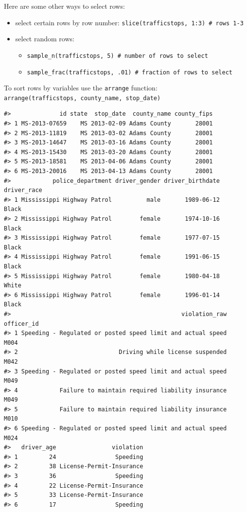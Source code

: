 \documentclass[]{book}
\providecommand{\tightlist}{%
  \setlength{\itemsep}{0pt}\setlength{\parskip}{0pt}}
\theoremstyle{definition}
\theoremstyle{definition}
\theoremstyle{definition}
\theoremstyle{remark}
\begin{document}
Here are some other ways to select rows:

\begin{itemize}
\tightlist
\item
  select certain rows by row number:
  \texttt{slice(trafficstops,\ 1:3)\ \#\ rows\ 1-3}
\item
  select random rows:

  \begin{itemize}
  \tightlist
  \item
    \texttt{sample\_n(trafficstops,\ 5)\ \#\ number\ of\ rows\ to\ select}
  \item
    \texttt{sample\_frac(trafficstops,\ .01)\ \#\ fraction\ of\ rows\ to\ select}
  \end{itemize}
\end{itemize}

To sort rows by variables use the \texttt{arrange} function:
\texttt{arrange(trafficstops,\ county\_name,\ stop\_date)}

\begin{verbatim}
#>              id state  stop_date  county_name county_fips
#> 1 MS-2013-07659    MS 2013-02-09 Adams County       28001
#> 2 MS-2013-11819    MS 2013-03-02 Adams County       28001
#> 3 MS-2013-14647    MS 2013-03-16 Adams County       28001
#> 4 MS-2013-15430    MS 2013-03-20 Adams County       28001
#> 5 MS-2013-18581    MS 2013-04-06 Adams County       28001
#> 6 MS-2013-20016    MS 2013-04-13 Adams County       28001
#>            police_department driver_gender driver_birthdate driver_race
#> 1 Mississippi Highway Patrol          male       1989-06-12       Black
#> 2 Mississippi Highway Patrol        female       1974-10-16       Black
#> 3 Mississippi Highway Patrol        female       1977-07-15       Black
#> 4 Mississippi Highway Patrol        female       1991-06-15       Black
#> 5 Mississippi Highway Patrol        female       1980-04-18       White
#> 6 Mississippi Highway Patrol        female       1996-01-14       Black
#>                                                 violation_raw officer_id
#> 1 Speeding - Regulated or posted speed limit and actual speed       M004
#> 2                             Driving while license suspended       M042
#> 3 Speeding - Regulated or posted speed limit and actual speed       M049
#> 4            Failure to maintain required liability insurance       M049
#> 5            Failure to maintain required liability insurance       M010
#> 6 Speeding - Regulated or posted speed limit and actual speed       M024
#>   driver_age                violation
#> 1         24                 Speeding
#> 2         38 License-Permit-Insurance
#> 3         36                 Speeding
#> 4         22 License-Permit-Insurance
#> 5         33 License-Permit-Insurance
#> 6         17                 Speeding
\end{verbatim}
\end{document}
